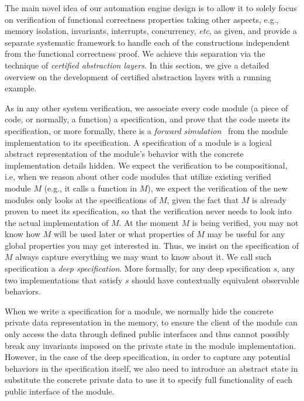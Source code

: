 The main novel idea of our automation engine design is to allow it to solely focus on verification
of functional correctness properties taking other aspects,
e.g., memory isolation, invariants, interrupts, concurrency, {\it etc}, as given, and provide
a separate systematic framework to handle each of the constructions independent from the functional correctness proof.
We achieve this separation via the technique of \emph{certified abstraction layers}.
In this section, we give a detailed overview on the development of certified abstraction layers
with a running example.

As in any other system verification, we associate every code module (a piece of code,
or normally, a function)
a specification, and prove that the code meets its specification, or more
formally, there is a {\em forward simulation}~\cite{Lynch95} from the module
implementation to its specification. A specification of a module is a logical
abstract representation of the module's behavior with the concrete
implementation details hidden. We expect the verification to be compositional,
i.e, when we reason about other code modules that utilize existing verified
module $M$ (e.g., it calls a function in $M$), we expect the verification
of the new modules only looks at the specifications of $M$, given the fact
that $M$ is already proven to meet its specification, so that the verification
never needs to look into the actual implementation of $M$. At the moment $M$ is
being verified, you may not know how $M$ will be used later or what properties of
$M$ may be useful for any global properties you may get interested in.
Thus, we insist on the specification of $M$ always capture everything
we may want to know about it. We call such specification a {\em deep specification}.
More formally, for any deep specification $s$, any two implementations that satisfy $s$
should have contextually equivalent observable behaviors. 

When we write a specification for a module, we normally hide the
concrete private data representation in the memory, to ensure the client
of the module can only access the data through defined public interfaces
and thus cannot possibly break any invariants imposed on the private
state in the module implementation. However, in the case of the deep
specification, in order to capture any potential behaviors in the
specification itself, we also need to introduce an abstract state
in substitute the concrete private data to use it to specify
full functionality of each public interface of the module.

